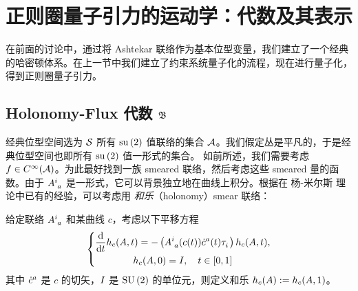 
\chapter{正则圈量子引力的运动学：代数及其表示}

	在前面的讨论中，通过将 Ashtekar 联络作为基本位型变量，我们建立了一个经典的哈密顿体系。在上一节中我们建立了约束系统量子化的流程，现在进行量子化，得到正则圈量子引力。

	\section{\texorpdfstring{Holonomy-Flux 代数 $\mathfrak{B}$}{Holonomy-Flux 代数 B}}

		经典位型空间选为 $\mathcal{S}$ 所有 $\mathrm{su}\left( 2 \right)$ 值联络的集合 $\mathcal{A}$。我们假定丛是平凡的，于是经典位型空间也即所有 $\mathrm{su}\left( 2 \right)$ 值一形式的集合。%
		如前所述，我们需要考虑 $f\in C^\infty(\mathcal{A})$。为此最好找到一族 smeared 联络，然后考虑这些 smeared 量的函数。由于 $\tensor{A}{^i_a}$ 是一形式，它可以背景独立地在曲线上积分。根据在 杨-米尔斯 理论中已有的经验，可以考虑用 \emph{和乐}（holonomy）smear 联络：
		\begin{Definition}[Holonomy]
			给定联络 $\tensor{A}{^i_a}$ 和某曲线 $c$，考虑以下平移方程
			\begin{equation}
				\left\{
					\begin{gathered}
						\dv{t}h_c(A,t) = - \left( \tensor{A}{^i_a}(c(t)) \tensor{\dot{c}}{^a}(t) \tensor{\tau}{_i} \right) h_c(A,t),\\
						h_c(A,0) = \II \qc t\in\left[ 0,1 \right]
					\end{gathered}
				\right.
			\end{equation}
			其中 $\tensor{\dot{c}}{^a}$ 是 $c$ 的切矢，$I$ 是 $\mathrm{SU}\left(2\right)$ 的单位元，则定义和乐 $h_c(A) := h_c(A,1)$。
		\end{Definition}
